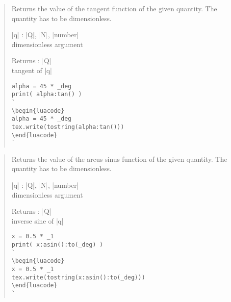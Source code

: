 \documentclass{ltxdoc}
\begin{document}
\begin{quote}
  Returns the value of the tangent function of the given quantity. The quantity has to be dimensionless.

  \begin{description}
  \item |q| : |Q|, |N|, |number|\\
    dimensionless argument

  \item Returns : |Q|\\
    tangent of |q|
  \end{description}

\begin{lstlisting}
alpha = 45 * _deg
print( alpha:tan() )
`
\begin{luacode}
alpha = 45 * _deg
tex.write(tostring(alpha:tan()))
\end{luacode}
`
\end{lstlisting}

\end{quote}



\begin{quote}
  Returns the value of the arcus sinus function of the given quantity. The quantity has to be dimensionless.

  \begin{description}
  \item |q| : |Q|, |N|, |number|\\
    dimensionless argument

  \item Returns : |Q|\\
    inverse sine of |q|
  \end{description}

\begin{lstlisting}
x = 0.5 * _1
print( x:asin():to(_deg) )
`
\begin{luacode}
x = 0.5 * _1
tex.write(tostring(x:asin():to(_deg)))
\end{luacode}
`
\end{lstlisting}

\end{quote}
\end{document}
